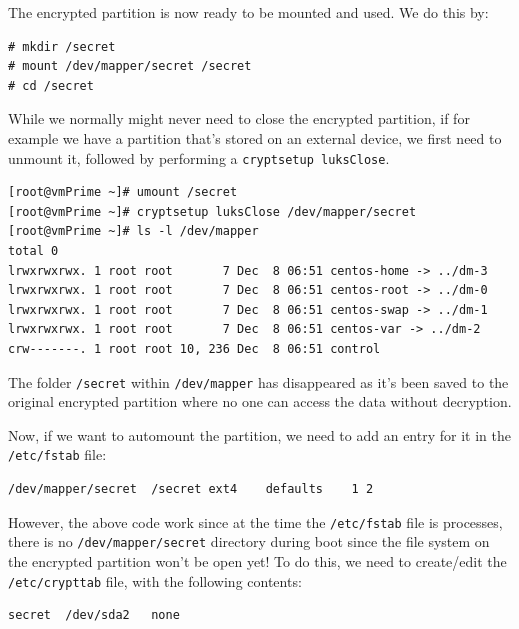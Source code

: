\noindent
The encrypted partition is now ready to be mounted and used. We do this by:

\vspace{-15pt}
\begin{verbatim}
# mkdir /secret
# mount /dev/mapper/secret /secret
# cd /secret
\end{verbatim}
\vspace{-10pt}

\noindent
While we normally might never need to close the encrypted partition, if for example we have a partition that's stored on an external device, we first need to unmount it, followed by performing a \verb|cryptsetup luksClose|.

\vspace{-15pt}
\begin{verbatim}
[root@vmPrime ~]# umount /secret
[root@vmPrime ~]# cryptsetup luksClose /dev/mapper/secret
[root@vmPrime ~]# ls -l /dev/mapper
total 0
lrwxrwxrwx. 1 root root       7 Dec  8 06:51 centos-home -> ../dm-3
lrwxrwxrwx. 1 root root       7 Dec  8 06:51 centos-root -> ../dm-0
lrwxrwxrwx. 1 root root       7 Dec  8 06:51 centos-swap -> ../dm-1
lrwxrwxrwx. 1 root root       7 Dec  8 06:51 centos-var -> ../dm-2
crw-------. 1 root root 10, 236 Dec  8 06:51 control
\end{verbatim}
\vspace{-10pt}

\noindent
The folder \verb|/secret| within \verb|/dev/mapper| has disappeared as it's been saved to the original encrypted partition where no one can access the data without decryption. 

Now, if we want to automount the partition, we need to add an entry for it in the \verb|/etc/fstab| file:

\vspace{-15pt}
\begin{verbatim}
/dev/mapper/secret	/secret	ext4	defaults	1 2
\end{verbatim}
\vspace{-10pt}

\noindent
However, the above code work since at the time the \verb|/etc/fstab| file is processes, there is no \verb|/dev/mapper/secret| directory during boot since the file system on the encrypted partition won't be open yet! To do this, we need to create/edit the \verb|/etc/crypttab| file, with the following contents:

\vspace{-15pt}
\begin{verbatim}
secret	/dev/sda2	none
\end{verbatim}
\vspace{-10pt}


